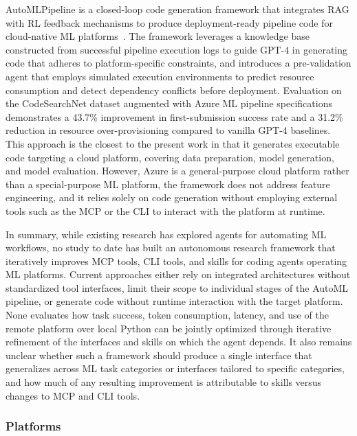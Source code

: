 \documentclass[
english,                 %
bibtex,                  %
includeExtraAbstracts, %
]{kththesis}
\numberwithin{listing}{chapter}
\begin{document}
Auto\gls{ML}Pipeline is a closed-loop code generation framework that integrates \gls{RAG} with \gls{RL} feedback mechanisms to produce deployment-ready pipeline code for cloud-native \gls{ML} platforms~\cite{zhao_automl-pipeline_2026}. The framework leverages a knowledge base constructed from successful pipeline execution logs to guide \gls{GPT}-4 in generating code that adheres to platform-specific constraints, and introduces a pre-validation agent that employs simulated execution environments to predict resource consumption and detect dependency conflicts before deployment. Evaluation on the CodeSearchNet dataset augmented with Azure \gls{ML} pipeline specifications demonstrates a 43.7\% improvement in first-submission success rate and a 31.2\% reduction in resource over-provisioning compared to vanilla \gls{GPT}-4 baselines. This approach is the closest to the present work in that it generates executable code targeting a cloud platform, covering data preparation, model generation, and model evaluation. However, Azure is a general-purpose cloud platform rather than a special-purpose \gls{ML} platform, the framework does not address feature engineering, and it relies solely on code generation without employing external tools such as the \gls{MCP} or the \gls{CLI} to interact with the platform at runtime.

In summary, while existing research has explored agents for automating \gls{ML} workflows, no study to date has built an autonomous research framework that iteratively improves \gls{MCP} tools, \gls{CLI} tools, and skills for coding agents operating \gls{ML} platforms. Current approaches either rely on integrated architectures without standardized tool interfaces, limit their scope to individual stages of the \gls{AutoML} pipeline, or generate code without runtime interaction with the target platform. None evaluates how task success, token consumption, latency, and use of the remote platform over local Python can be jointly optimized through iterative refinement of the interfaces and skills on which the agent depends. It also remains unclear whether such a framework should produce a single interface that generalizes across \gls{ML} task categories or interfaces tailored to specific categories, and how much of any resulting improvement is attributable to skills versus changes to \gls{MCP} and \gls{CLI} tools.

\subsubsection{Platforms}
\end{document}
